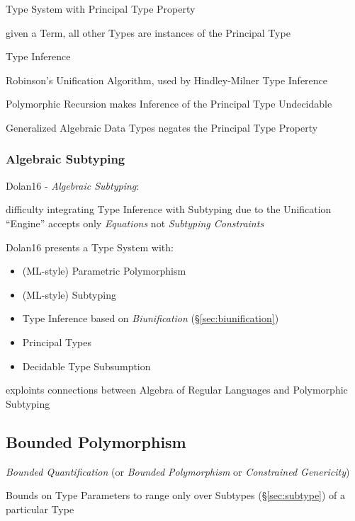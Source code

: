 Type System with Principal Type Property

given a Term, all other Types are instances of the Principal Type

Type Inference

Robinson's Unification Algorithm, used by Hindley-Milner Type
Inference

Polymorphic Recursion makes Inference of the Principal Type Undecidable

Generalized Algebraic Data Types negates the Principal Type Property



\subsubsection{Algebraic Subtyping}\label{sec:algebraic_subtyping}

Dolan16 - \emph{Algebraic Subtyping}:

difficulty integrating Type Inference with Subtyping due to the
Unification ``Engine'' accepts only \emph{Equations} not
\emph{Subtyping Constraints}

Dolan16 presents a Type System with:
\begin{itemize}
  \item (ML-style) Parametric Polymorphism
  \item (ML-style) Subtyping
  \item Type Inference based on \emph{Biunification}
    (\S\ref{sec:biunification})
  \item Principal Types
  \item Decidable Type Subsumption
\end{itemize}

exploints connections between Algebra of Regular Languages and
Polymorphic Subtyping



\subsection{Bounded Polymorphism}\label{sec:bounded_polymorphism}

\emph{Bounded Quantification} (or \emph{Bounded Polymorphism} or
\emph{Constrained Genericity})

Bounds on Type Parameters to range only over Subtypes
(\S\ref{sec:subtype}) of a particular Type


